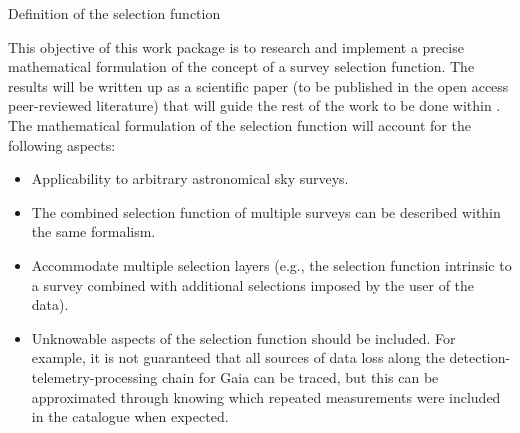 \begin{workpackage}{Definition of the selection function}
  \label{wp:selfundefinition}
  
  \makewptable %

  \begin{wpobjectives}
    This objective of this work package is to research and implement a precise mathematical formulation of the concept of a survey selection function. The results will be written up as a scientific paper (to be published in the open access peer-reviewed literature) that will guide the rest of the work to be done within {\acro}.  The mathematical formulation of the selection function will account for the following aspects:
    \begin{itemize}
        \item Applicability to arbitrary astronomical sky surveys.
        \item The combined selection function of multiple surveys can be described within the same formalism.
        \item Accommodate multiple selection layers (e.g., the selection function intrinsic to a survey combined with additional selections imposed by the user of the data).
        \item Unknowable aspects of the selection function should be included. For example, it is not guaranteed that all sources of data loss along the detection-telemetry-processing chain for Gaia can be traced, but this can be approximated through knowing which repeated measurements were included in the catalogue when expected.
    \end{itemize}
  \end{wpobjectives}

  \begin{wpdescription}



\end{wpdescription}
\end{workpackage}
